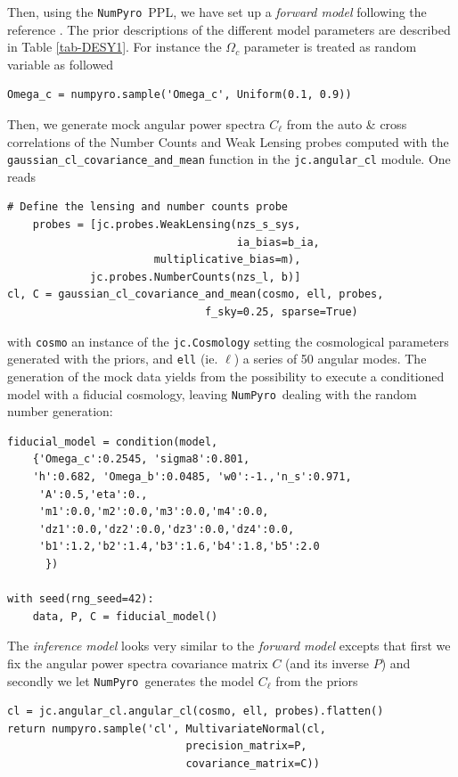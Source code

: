 \documentclass[twocolumn,twocolappendix,nofootinbib]{openjournal}
\newcommand{\numpyro}{\texttt{NumPyro}}
\begin{document}
Then, using the \numpyro\ PPL, we have set up a \textit{forward model} following the reference \citep{2018PhRvD..98d3526A}. The prior descriptions of the different model parameters are described in Table \ref{tab-DESY1}.  For instance the $\Omega_c$ parameter is treated as random variable as followed
\begin{verbatim}
Omega_c = numpyro.sample('Omega_c', Uniform(0.1, 0.9))
\end{verbatim}
Then, we generate mock angular power spectra $C_\ell$ from the auto \& cross correlations of the Number Counts and Weak Lensing probes computed with the \texttt{gaussian\_cl\_covariance\_and\_mean} function in the \texttt{jc.angular\_cl} module. One reads
\begin{verbatim}
# Define the lensing and number counts probe
    probes = [jc.probes.WeakLensing(nzs_s_sys, 
                                    ia_bias=b_ia,
                       multiplicative_bias=m),
             jc.probes.NumberCounts(nzs_l, b)]
cl, C = gaussian_cl_covariance_and_mean(cosmo, ell, probes, 
                               f_sky=0.25, sparse=True)
\end{verbatim} 
with \texttt{cosmo} an instance of the \texttt{jc.Cosmology} setting the cosmological parameters generated with the priors, and \texttt{ell} (ie. $\ell$) a series of 50 angular modes. The generation of the mock data yields from the possibility to execute a conditioned model with a fiducial cosmology, leaving \numpyro\ dealing with the random number generation:
\begin{verbatim}
fiducial_model = condition(model,
    {'Omega_c':0.2545, 'sigma8':0.801, 
    'h':0.682, 'Omega_b':0.0485, 'w0':-1.,'n_s':0.971,
     'A':0.5,'eta':0.,
     'm1':0.0,'m2':0.0,'m3':0.0,'m4':0.0,
     'dz1':0.0,'dz2':0.0,'dz3':0.0,'dz4':0.0,
     'b1':1.2,'b2':1.4,'b3':1.6,'b4':1.8,'b5':2.0
      })

with seed(rng_seed=42):
    data, P, C = fiducial_model()
\end{verbatim}
The \textit{inference model} looks very similar to the \textit{forward model} excepts that first we fix the angular power spectra covariance matrix $C$ (and its inverse $P$) and secondly we let \numpyro\ generates the model $C_{\ell}$ from the priors
\begin{verbatim}
cl = jc.angular_cl.angular_cl(cosmo, ell, probes).flatten()
return numpyro.sample('cl', MultivariateNormal(cl, 
                            precision_matrix=P,
                            covariance_matrix=C))
\end{verbatim}
\end{document}
